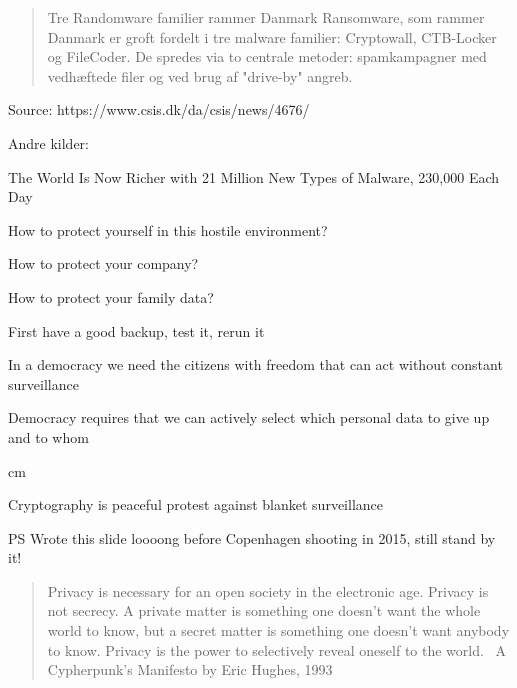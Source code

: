 \documentclass[20pt,landscape,a4paper,footrule]{foils}
\begin{document}

\begin{quote}
Tre Randomware familier rammer Danmark
Ransomware, som rammer Danmark er groft fordelt i tre malware familier: Cryptowall, CTB-Locker og FileCoder. De spredes via to centrale metoder: spamkampagner med vedhæftede filer og ved brug af "drive-by" angreb.
\end{quote}

Source:  https://www.csis.dk/da/csis/news/4676/

Andre kilder:
\begin{list2}
\item The World Is Now Richer with 21 Million New Types of Malware, 230,000 Each Day\\
{\small{}}
\end{list2}



\begin{list2}
\item How to protect yourself in this hostile environment?
\item How to protect your company?
\item How to protect your family data?
\end{list2}

\centerline{First have a good backup, test it, rerun it}



{\large
In a democracy we need the citizens with freedom that can act without constant surveillance

Democracy requires that we can actively select which personal data to give up and to whom
}


 cm
\centerline{\large Cryptography is peaceful protest against blanket surveillance}

\vskip 2cm
PS Wrote this slide loooong before Copenhagen shooting in 2015, still stand by it!




\begin{quote}
	Privacy is necessary for an open society in the electronic age. Privacy is not secrecy. A private matter is something one doesn't want the whole world to know, but a secret matter is something one doesn't want anybody to know. Privacy is the power to selectively reveal oneself to the world. ~A Cypherpunk's Manifesto by Eric Hughes, 1993
\end{quote}
\end{document}
